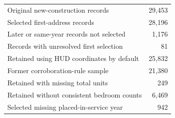 \begin{tabular}{lr}
\hline
Original new-construction records & 29,453 \\
Selected first-address records & 28,196 \\
Later or same-year records not selected & 1,176 \\
Records with unresolved first selection & 81 \\
Retained using HUD coordinates by default & 25,832 \\
Former corroboration-rule sample & 21,380 \\
Retained with missing total units & 249 \\
Retained without consistent bedroom counts & 6,469 \\
Selected missing placed-in-service year & 942 \\
\hline
\end{tabular}

